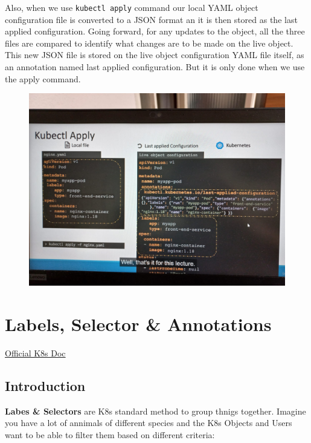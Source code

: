 \documentclass{article}
\begin{document}
Also, when we use \verb|kubectl apply| command our local YAML object configuration file is converted to a JSON format an it is then stored as the last applied configuration. Going forward, for any updates to the object, all the three files are compared to identify what changes are to be made on the live object. This new JSON file is stored on the live object configuration YAML file itself, as an annotation named last applied configuration. But it is only done when we use the apply command.

\begin{figure}[H]
    \centering
    \includegraphics[width=\textwidth]{pictures/apply1.jpeg}
\end{figure}

\newpage
\section{Labels, Selector \& Annotations}

\href{https://kubernetes.io/docs/concepts/overview/working-with-objects/labels/}{Official K8s Doc}

\subsection{Introduction}

\textbf{Labes \& Selectors} are K8s standard method to group thnigs together. Imagine you have a lot of annimals of different species and the K8s Objects and Users want to be able  to filter them based on different criteria: 
\end{document}
